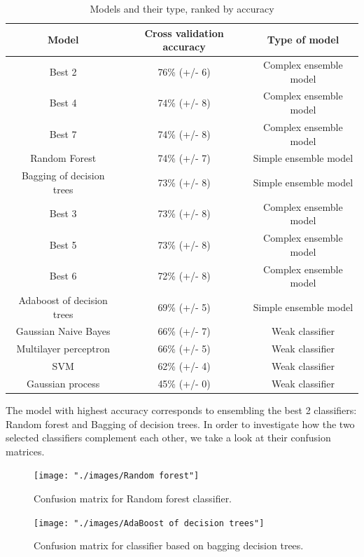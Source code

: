 \documentclass{article}
\begin{document}
\begin{table}[H]
\centering
\begin{tabular}{||c|c|c||}
\hline
\textbf{Model} & \textbf{Cross validation accuracy} & \textbf{Type of model} \\ [0.5ex] 
\hline \hline
Best 2 & 76\% (+/- 6) & Complex ensemble model \\
Best 4 & 74\% (+/- 8) & Complex ensemble model \\
Best 7 & 74\% (+/- 8) & Complex ensemble model  \\
Random Forest & 74\% (+/- 7) & Simple ensemble model \\
Bagging of decision trees & 73\% (+/- 8) & Simple ensemble model \\ 
Best 3 & 73\% (+/- 8) & Complex ensemble model \\
Best 5 & 73\% (+/- 8) & Complex ensemble model \\
Best 6 & 72\% (+/- 8) & Complex ensemble model \\
Adaboost of decision trees & 69\% (+/- 5) & Simple ensemble model \\
Gaussian Naive Bayes &66\% (+/- 7) & Weak classifier \\
Multilayer perceptron & 66\% (+/- 5) & Weak classifier \\
SVM & 62\% (+/- 4) & Weak classifier \\
Gaussian process & 45\% (+/- 0) & Weak classifier \\[1ex]
\hline 
\end{tabular}
\caption{Models and their type, ranked by accuracy}
\label{table:rankingModels}
\end{table}

The model with highest accuracy corresponds to ensembling the best 2 classifiers: Random forest and Bagging of decision trees. In order to investigate how the two selected classifiers complement each other, we take a look at their confusion matrices. 

\begin{figure}[H]
  \centering
  \texttt{[image: "./images/Random forest"]}
  \caption{Confusion matrix for Random forest classifier.}
  \label{fig:classification/rf_confusion}
\end{figure}


\begin{figure}[H]
  \centering
  \texttt{[image: "./images/AdaBoost of decision trees"]}
  \caption{Confusion matrix for classifier based on bagging decision trees.}
  \label{fig:classification/bag_confusion}
\end{figure}
\end{document}
